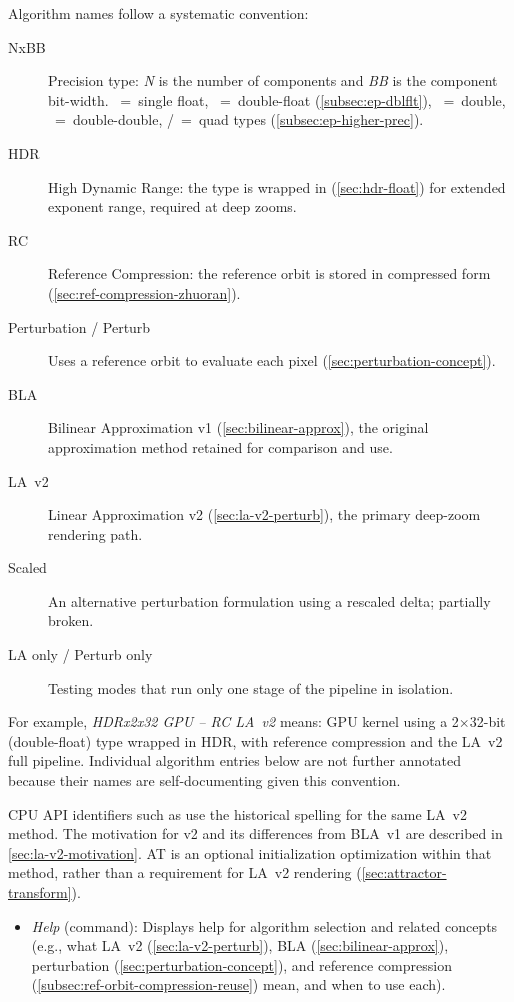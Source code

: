 \begin{itemize}
  Algorithm names follow a systematic convention:
  \begin{description}
    \item[\textrm{N}x\textrm{BB}] Precision type: \emph{N} is the number of
    components and \emph{BB} is the component bit-width.
    ~=~single float, ~=~double-float
    (\cref{subsec:ep-dblflt}), ~=~double,
    ~=~double-double, /~=~quad
    types (\cref{subsec:ep-higher-prec}).
    \item[HDR] High Dynamic Range: the type is wrapped in
     (\cref{sec:hdr-float}) for extended exponent range,
    required at deep zooms.
    \item[RC] Reference Compression: the reference orbit is stored in
    compressed form (\cref{sec:ref-compression-zhuoran}).
    \item[Perturbation / Perturb] Uses a reference orbit to evaluate
    each pixel (\cref{sec:perturbation-concept}).
    \item[BLA] Bilinear Approximation v1 (\cref{sec:bilinear-approx}),
    the original approximation method retained for comparison and use.
    \item[LA~v2] Linear Approximation v2 (\cref{sec:la-v2-perturb}),
    the primary deep-zoom rendering path.
    \item[Scaled] An alternative perturbation formulation using a
    rescaled delta; partially broken.
    \item[LA only / Perturb only] Testing modes that run only one
    stage of the pipeline in isolation.
  \end{description}
  For example, \emph{HDRx2x32 GPU -- RC LA~v2} means: GPU kernel using
  a 2$\times$32-bit (double-float) type wrapped in HDR, with reference
  compression and the LA~v2 full pipeline.  Individual algorithm entries
  below are not further annotated because their names are
  self-documenting given this convention.

  CPU API identifiers such as  use the
  historical  spelling for the same LA~v2 method. The
  motivation for v2 and its differences from BLA~v1 are described in
  \cref{sec:la-v2-motivation}. AT is an optional initialization
  optimization within that method, rather than a requirement for
  LA~v2 rendering (\cref{sec:attractor-transform}).

    \begin{itemize}
      \item \emph{Help} (command): Displays help for algorithm selection and
      related concepts (e.g., what LA~v2 (\cref{sec:la-v2-perturb}), BLA
      (\cref{sec:bilinear-approx}), perturbation (\cref{sec:perturbation-concept}),
      and reference compression (\cref{subsec:ref-orbit-compression-reuse}) mean,
      and when to use each).


\end{itemize}
\end{itemize}
